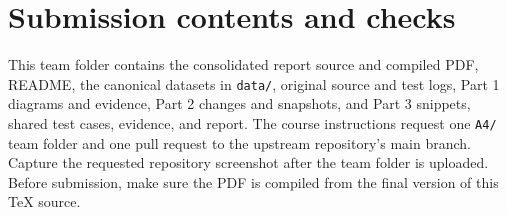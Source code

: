 \documentclass[11pt,a4paper]{article}
\newcommand{\code}[1]{\texttt{\small #1}}
\begin{document}
\appendix
\section{Submission contents and checks}
This team folder contains the consolidated report source and compiled PDF,
README, the canonical datasets in \code{data/}, original source and test logs,
Part 1 diagrams and evidence, Part 2 changes and snapshots, and Part 3
snippets, shared test cases, evidence, and report. The course instructions request one \code{A4/} team folder and one pull
request to the upstream repository's main branch. Capture the requested repository screenshot after
the team folder is uploaded. Before submission, make sure the PDF is compiled from the final version of
this TeX source.
\end{document}
